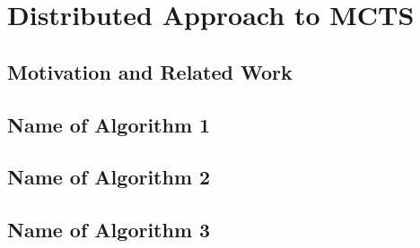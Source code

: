 \chapter{Distributed Approach to MCTS}

\section{Motivation and Related Work}

\section{Name of Algorithm 1}
\section{Name of Algorithm 2}
\section{Name of Algorithm 3}
